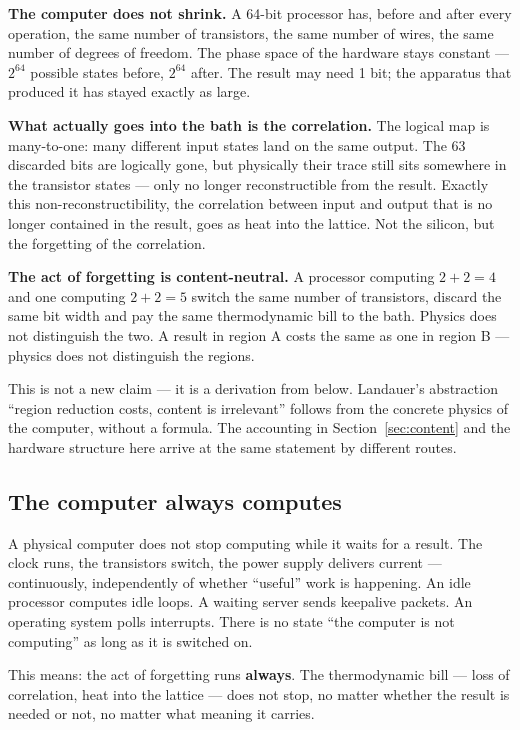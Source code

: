 \LB \textbf{The computer does not shrink.} A 64-bit processor has, before and
after every operation, the same number of transistors, the same number of wires,
the same number of degrees of freedom. The phase space of the hardware stays
constant --- $2^{64}$ possible states before, $2^{64}$ after. The result may need
1 bit; the apparatus that produced it has stayed exactly as large.

\LB \textbf{What actually goes into the bath is the correlation.} The logical map
is many-to-one: many different input states land on the same output. The 63
discarded bits are logically gone, but physically their trace still sits somewhere
in the transistor states --- only no longer reconstructible from the result.
Exactly this non-reconstructibility, the correlation between input and output that
is no longer contained in the result, goes as heat into the lattice. Not the
silicon, but the forgetting of the correlation.

\LB \textbf{The act of forgetting is content-neutral.} A processor computing
$2+2=4$ and one computing $2+2=5$ switch the same number of transistors, discard
the same bit width and pay the same thermodynamic bill to the bath. Physics does
not distinguish the two. A result in region A costs the same as one in region B
--- physics does not distinguish the regions.

This is not a new claim --- it is a derivation from below. Landauer's abstraction
“region reduction costs, content is irrelevant” follows from the concrete physics
of the computer, without a formula. The accounting in Section~\ref{sec:content}
and the hardware structure here arrive at the same statement by different routes.

\subsection{The computer always computes}
\label{sec:always}

A physical computer does not stop computing while it waits for a result. The clock
runs, the transistors switch, the power supply delivers current --- continuously,
independently of whether “useful” work is happening. An idle processor computes
idle loops. A waiting server sends keepalive packets. An operating system polls
interrupts. There is no state “the computer is not computing” as long as it is
switched on.

This means: the act of forgetting runs \textbf{always}. The thermodynamic bill ---
loss of correlation, heat into the lattice --- does not stop, no matter whether
the result is needed or not, no matter what meaning it carries.

